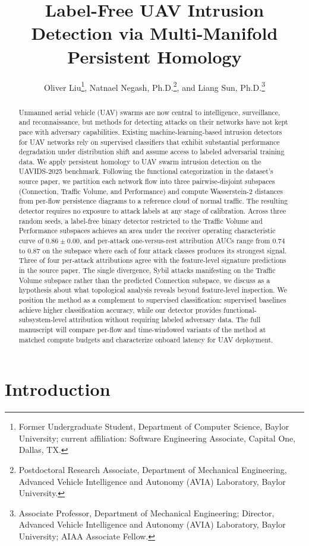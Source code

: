 \documentclass[conf]{new-aiaa}
\title{Label-Free UAV Intrusion Detection via Multi-Manifold Persistent Homology}
\author{Oliver Liu\footnote{Former Undergraduate Student, Department of Computer Science, Baylor University; current affiliation: Software Engineering Associate, Capital One, Dallas, TX.}, 
Natnael Negash, Ph.D.\footnote{Postdoctoral Research Associate, Department of Mechanical Engineering, Advanced Vehicle Intelligence and Autonomy (AVIA) Laboratory, Baylor University.}, 
and Liang Sun, Ph.D.\footnote{Associate Professor, Department of Mechanical Engineering; Director, Advanced Vehicle Intelligence and Autonomy (AVIA) Laboratory, Baylor University; AIAA Associate Fellow.}}
\affil{Baylor University, Waco, TX 76798}
\begin{document}
\maketitle

\begin{abstract}
Unmanned aerial vehicle (UAV) swarms are now central to intelligence, surveillance, and reconnaissance, but methods for detecting attacks on their networks have not kept pace with adversary capabilities. Existing machine-learning-based intrusion detectors for UAV networks rely on supervised classifiers that exhibit substantial performance degradation under distribution shift and assume access to labeled adversarial training data. We apply persistent homology to UAV swarm intrusion detection on the UAVIDS-2025 benchmark. Following the functional categorization in the dataset's source paper, we partition each network flow into three pairwise-disjoint subspaces (Connection, Traffic Volume, and Performance) and compute Wasserstein-2 distances from per-flow persistence diagrams to a reference cloud of normal traffic. The resulting detector requires no exposure to attack labels at any stage of calibration. Across three random seeds, a label-free binary detector restricted to the Traffic Volume and Performance subspaces achieves an area under the receiver operating characteristic curve of $0.86 \pm 0.00$, and per-attack one-versus-rest attribution AUCs range from $0.74$ to $0.87$ on the subspace where each of four attack classes produces its strongest signal. Three of four per-attack attributions agree with the feature-level signature predictions in the source paper. The single divergence, Sybil attacks manifesting on the Traffic Volume subspace rather than the predicted Connection subspace, we discuss as a hypothesis about what topological analysis reveals beyond feature-level inspection. We position the method as a complement to supervised classification: supervised baselines achieve higher classification accuracy, while our detector provides functional-subsystem-level attribution without requiring labeled adversary data. The full manuscript will compare per-flow and time-windowed variants of the method at matched compute budgets and characterize onboard latency for UAV deployment.
\end{abstract}

\section{Introduction}
\end{document}
